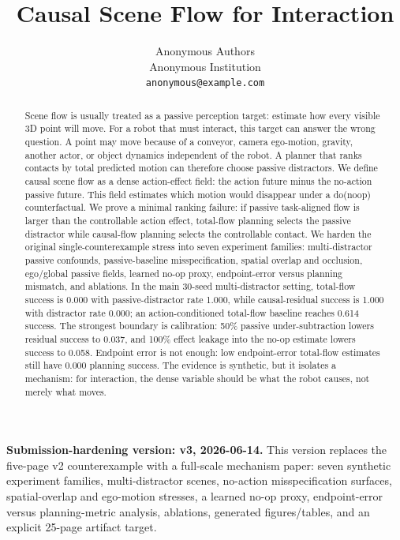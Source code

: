 \documentclass{article}
\title{Causal Scene Flow for Interaction}
\author{Anonymous Authors\\
Anonymous Institution\\
\texttt{anonymous@example.com}}
\begin{document}
\maketitle
\noindent\textbf{Submission-hardening version: v3, 2026-06-14.}
This version replaces the five-page v2 counterexample with a full-scale mechanism paper:
seven synthetic experiment families, multi-distractor scenes, no-action misspecification
surfaces, spatial-overlap and ego-motion stresses, a learned no-op proxy, endpoint-error
versus planning-metric analysis, ablations, generated figures/tables, and an explicit
25-page artifact target.

\begin{abstract}
Scene flow is usually treated as a passive perception target: estimate how every visible
3D point will move.  For a robot that must interact, this target can answer the wrong
question.  A point may move because of a conveyor, camera ego-motion, gravity, another
actor, or object dynamics independent of the robot.  A planner that ranks contacts by
total predicted motion can therefore choose passive distractors.  We define causal scene
flow as a dense action-effect field: the action future minus the no-action passive
future.  This field estimates which motion would disappear under a do(noop)
counterfactual.  We prove a minimal ranking failure: if passive task-aligned flow is
larger than the controllable action effect, total-flow planning selects the passive
distractor while causal-flow planning selects the controllable contact.  We harden the
original single-counterexample stress into seven experiment families: multi-distractor
passive confounds, passive-baseline misspecification, spatial overlap and occlusion,
ego/global passive fields, learned no-op proxy, endpoint-error versus planning mismatch,
and ablations.  In the main 30-seed multi-distractor setting, total-flow success is
0.000 with passive-distractor rate 1.000, while causal-residual success is 1.000 with
distractor rate 0.000; an action-conditioned total-flow baseline reaches 0.614 success.
The strongest boundary is calibration: 50\% passive under-subtraction lowers residual
success to 0.037, and 100\% effect leakage into the no-op estimate lowers success to
0.058.  Endpoint error is not enough: low endpoint-error total-flow estimates still have
0.000 planning success.  The evidence is synthetic, but it isolates a mechanism: for
interaction, the dense variable should be what the robot causes, not merely what moves.
\end{abstract}
\end{document}
